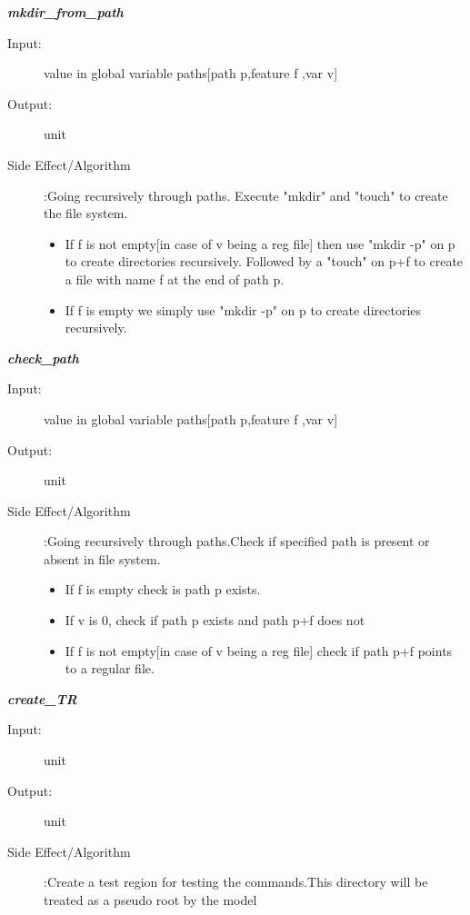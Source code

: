 \documentclass[12pt]{article}
\begin{document}
\begin{description}
\item \textbf{\textit{mkdir\_from\_path}}
\begin{description}
    \item[Input:] value in global variable paths[path p,feature f ,var v]
    \item[Output:] unit
    \item[Side Effect/Algorithm]:Going recursively through paths. Execute "mkdir" and "touch" to create the file system.
    \begin{itemize}
            \item If f is not empty[in case of v being a reg file] then use "mkdir -p" on p to create directories recursively. Followed by a "touch" on p+f to create a file with name f at the end of path p.
            \item  If f is empty we simply use "mkdir -p" on p to create directories recursively.
    \end{itemize}
    
\end{description}

\item \textbf{\textit{check\_path}}
\begin{description}
    \item[Input:] value in global variable paths[path p,feature f ,var v]
    \item[Output:] unit
    \item[Side Effect/Algorithm]:Going recursively through paths.Check if specified path is present or absent in file system. \begin{itemize}
            \item If f is empty check is path p exists.
            \item If v is 0, check if path p exists and path p+f does not
            \item If f is not empty[in case of v being a reg file] check if path p+f points to a regular file. 
    \end{itemize}
\end{description}

\item \textbf{\textit{create\_TR}}
\begin{description}
    \item[Input:] unit
    \item[Output:] unit
    \item[Side Effect/Algorithm]:Create a test region for testing the commands.This directory will be treated as a pseudo root by the model
\end{description}


\end{description}
\end{document}
